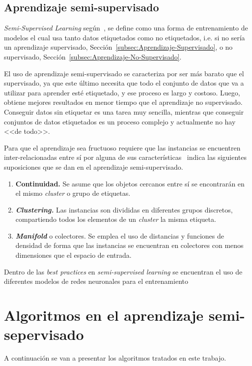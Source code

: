\subsection{Aprendizaje semi-supervisado}\label{subsec:Aprendizaje-Semi-Supervisado}
\textit{Semi-Supervised Learning} según~\cite{zhou2014semi}, se define como una forma de entrenamiento de modelos el cual usa tanto datos etiquetados como no etiquetados, i.e. si no sería un aprendizaje supervisado, Sección~\ref{subsec:Aprendizaje-Supervisado}, o no supervisado, Sección~\ref{subsec:Aprendizaje-No-Supervisado}. 

El uso de aprendizaje semi-supervisado se caracteriza por ser más barato que el supervisado, ya que este último necesita que todo el conjunto de datos que va a utilizar para aprender esté etiquetado, y ese proceso es largo y costoso. Luego, obtiene mejores resultados en menor tiempo que el aprendizaje no supervisado. 
Conseguir datos sin etiquetar es una tarea muy sencilla, mientras que conseguir conjuntos de datos etiquetados es un proceso complejo y actualmente no hay <<de todo>>.

Para que el aprendizaje sea fructuoso requiere que las instancias se encuentren inter-relacionadas entre sí por alguna de sus características~\cite{javatpoint_semisupervised} indica las siguientes suposiciones que se dan en el aprendizaje semi-supervisado.
\begin{enumerate}
	\item \textbf{Continuidad.} Se asume que los objetos cercanos entre sí se encontrarán en el mismo \textit{cluster} o grupo de etiquetas. 
	\item \textbf{\textit{Clustering.}} Las instancias son divididas en diferentes grupos discretos, compartiendo todos los elementos de un \textit{cluster} la misma etiqueta.
	\item \textbf{\textit{Manifold}} o colectores. Se emplea el uso de distancias y funciones de densidad de forma que las instancias se encuentran en colectores con menos dimensiones que el espacio de entrada.
\end{enumerate}

Dentro de las \textit{best practices} en \textit{semi-supervised learning} se encuentran el uso de diferentes modelos de redes neuronales para el entrenamiento~\cite{thekumparampil2018attention}


\section{Algoritmos en el aprendizaje semi-sepervisado}\label{sec_alg:semi-supervised}
A continuación se van a presentar los algoritmos tratados en este trabajo.

